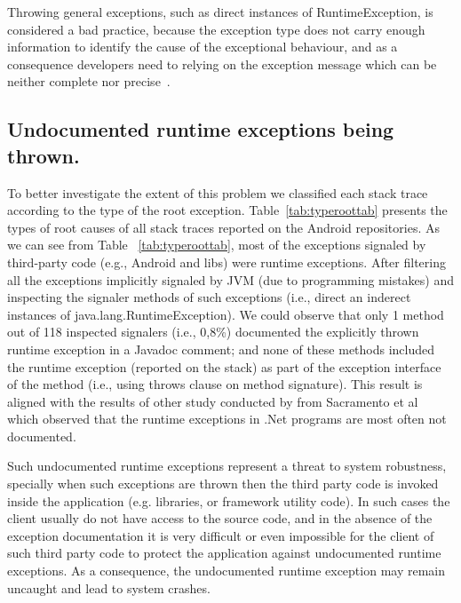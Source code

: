 \documentclass[conference]{IEEEtran}
\begin{document}
Throwing general exceptions, such as direct instances of RuntimeException, is  considered a
bad practice, because the exception type does not carry enough information to identify the
cause of the exceptional behaviour, and as a consequence developers need to relying on
the exception message which can be neither complete nor precise~\cite{gosling2000java}.


\subsection{Undocumented runtime exceptions being thrown.}

To better investigate the extent of this problem we classified each stack trace according to the type of the
root exception. Table~\ref{tab:typeroottab} presents the types of root causes of all stack traces reported on 
the Android repositories. As we can see from Table ~\ref{tab:typeroottab},  most of the exceptions signaled by third-party code
 (e.g., Android and libs) were runtime exceptions. After filtering all the exceptions implicitly signaled by 
JVM (due to programming mistakes) and inspecting the signaler methods of such exceptions (i.e.,  direct an inderect 
instances of java.lang.RuntimeException). We could observe that only 1 method out of 118 inspected signalers
 (i.e., 0,8\%) documented the explicitly thrown runtime exception in a Javadoc comment; and none of these methods
included the runtime exception  (reported on the stack) as part of the exception interface of the method (i.e., using 
throws clause on method signature). This result is aligned with the results of other  study conducted by from 
Sacramento et al ~\cite{sacramento2006unchecked} which observed that the
runtime exceptions in .Net programs are most often not documented.

Such undocumented runtime exceptions represent a threat to system robustness, specially
when such exceptions are thrown then the third party code is invoked inside the application (e.g. libraries, or framework utility code).
In such cases the client usually do not have access to the source code, and in the absence of
the exception documentation it is very difficult or even impossible for the client of such third party code to 
protect the application against undocumented runtime exceptions. As a consequence, the
 undocumented runtime exception may remain uncaught and lead to system crashes.
\end{document}
